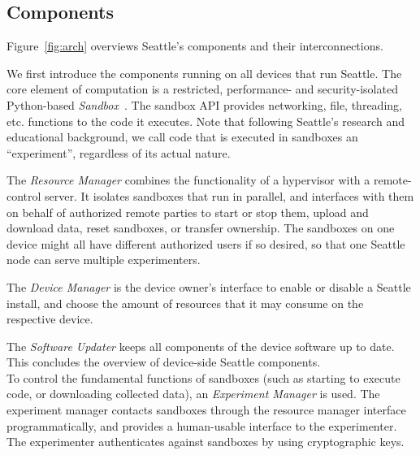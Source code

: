 \subsection{Components}

Figure~\ref{fig:arch} overviews Seattle's components and their
interconnections.

We first introduce the components running on all devices that
run Seattle.
The core element of computation is a restricted,
performance- and security-isolated Python-based
\textit{Sandbox}~\cite{RepySandbox,li2015fence}.
The sandbox \gls{API} provides
networking, file, threading, etc. functions to
the code it executes. Note that
following Seattle's research and educational background, we
call code that is executed in sandboxes an ``experiment'',
regardless of its actual nature.

The \textit{Resource Manager} combines the functionality of
a hypervisor with a remote-control server.
It isolates %
sandboxes that run in
parallel, and interfaces with them on behalf of authorized remote
parties to start or stop them, upload and download data, reset
sandboxes, or transfer ownership. The sandboxes on one
device might all have different authorized users if so desired,
so that one Seattle node can serve multiple experimenters.

The \textit{Device Manager} %
is the device owner's interface to enable or disable a Seattle
install, and choose the amount of resources that it may consume on the respective
device.

The \textit{Software Updater} keeps all components of the
device software up to date. This concludes the overview of
device-side Seattle components.
\\

To control the fundamental functions of sandboxes (such as
starting to execute code, or downloading collected data),
an \textit{Experiment Manager} %
is used. The experiment manager contacts sandboxes through the
resource manager interface programmatically, and provides a
human-usable interface to the experimenter. The experimenter
authenticates against sandboxes by using cryptographic keys.

